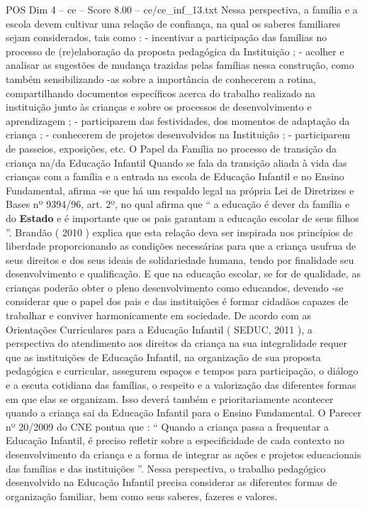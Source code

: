 \begin{textsample}{POS Dim 4 – ce – Score 8.00 – ce/ce\_inf\_13.txt}
Nessa perspectiva, a família e a escola devem cultivar uma relação de confiança, na qual os saberes familiares sejam considerados, tais como : - incentivar a participação das famílias no processo de (re)elaboração da proposta pedagógica da Instituição ; - acolher e analisar as sugestões de mudança trazidas pelas famílias nessa construção, como também sensibilizando -as sobre a importância de conhecerem a rotina, compartilhando documentos específicos acerca do trabalho realizado na instituição junto às crianças e sobre os processos de desenvolvimento e aprendizagem ; - participarem das festividades, dos momentos de adaptação da criança ; - conhecerem de projetos desenvolvidos na Instituição ; - participarem de passeios, exposições, etc.
O Papel da Família no processo de transição da criança na/da Educação Infantil Quando se fala da transição aliada à vida das crianças com a família e a entrada na escola de Educação Infantil e no Ensino Fundamental, afirma -se que há um respaldo legal na própria Lei de Diretrizes e Bases nº 9394/96, art. 2º, no qual afirma que “ a educação é dever da família e do \textbf{Estado} e é importante que os pais garantam a educação escolar de seus filhos ”.
Brandão ( 2010 ) explica que esta relação deva ser inspirada nos princípios de liberdade proporcionando as condições necessárias para que a criança usufrua de seus direitos e dos seus ideais de solidariedade humana, tendo por finalidade seu desenvolvimento e qualificação.
E que na educação escolar, se for de qualidade, as crianças poderão obter o pleno desenvolvimento como educandos, devendo -se considerar que o papel dos pais e das instituições é formar cidadãos capazes de trabalhar e conviver harmonicamente em sociedade.
De acordo com as Orientações Curriculares para a Educação Infantil ( SEDUC, 2011 ), a perspectiva do atendimento aos direitos da criança na sua integralidade requer que as instituições de Educação Infantil, na organização de sua proposta pedagógica e curricular, assegurem espaços e tempos para participação, o diálogo e a escuta cotidiana das famílias, o respeito e a valorização das diferentes formas em que elas se organizam.
Isso deverá também e prioritariamente acontecer quando a criança sai da Educação Infantil para o Ensino Fundamental.
O Parecer nº 20/2009 do CNE pontua que : “ Quando a criança passa a frequentar a Educação Infantil, é preciso refletir sobre a especificidade de cada contexto no desenvolvimento da criança e a forma de integrar as ações e projetos educacionais das famílias e das instituições ”.
Nessa perspectiva, o trabalho pedagógico desenvolvido na Educação Infantil precisa considerar as diferentes formas de organização familiar, bem como seus saberes, fazeres e valores.

\end{textsample}
